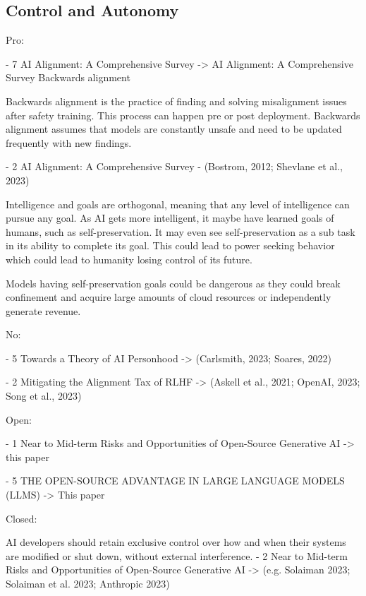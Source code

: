 \subsection{Control and Autonomy}

Pro:

- 7 AI Alignment: A Comprehensive Survey -> AI Alignment: A Comprehensive Survey
Backwards alignment
\citep{ji_ai_2023}

Backwards alignment is the practice of finding and solving misalignment issues after safety training. This process can happen pre or post deployment. Backwards alignment assumes that models are constantly unsafe and need to be updated frequently with new findings.

- 2 AI Alignment: A Comprehensive Survey - (Bostrom, 2012; Shevlane et al., 2023)
\citep{bostrom_superintelligent_2012}

Intelligence and goals are orthogonal, meaning that any level of intelligence can pursue any goal. As AI gets more intelligent, it maybe have learned goals of humans, such as self-preservation. It may even see self-preservation as a sub task in its ability to complete its goal. This could lead to power seeking behavior which could lead to humanity losing control of its future.

\citep{shevlane_model_2023}

Models having self-preservation goals could be dangerous as they could break confinement and acquire large amounts of cloud resources or independently generate revenue.

No:

- 5 Towards a Theory of AI Personhood -> (Carlsmith, 2023; Soares, 2022)
\citep{carlsmith_scheming_2023}



\citep{soares_central_2022}

- 2 Mitigating the Alignment Tax of RLHF -> (Askell et al., 2021; OpenAI, 2023; Song et al., 2023)
\citep{askell_general_2021}
\citep{openai_gpt_4_2023}
\citep{song_reward_2023}

Open: 

- 1 Near to Mid-term Risks and Opportunities of Open-Source Generative AI -> this paper
\citep{eiras_near_2024}

- 5 THE OPEN-SOURCE ADVANTAGE IN LARGE LANGUAGE MODELS (LLMS) -> This paper
\citep{manchanda_open_2025}

Closed:

AI developers should retain exclusive control over how and when their systems are modified or shut down, without external interference.
- 2 Near to Mid-term Risks and Opportunities of Open-Source Generative AI -> (e.g. Solaiman 2023; Solaiman et al. 2023; Anthropic 2023)
\citep{solaiman_gradient_2023}

